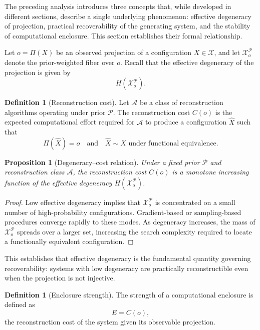 \documentclass[12pt, oneside]{article}
\theoremstyle{plain}
\newtheorem{proposition}[theorem]{Proposition}
\theoremstyle{definition}
\newtheorem{definition}[theorem]{Definition}
\theoremstyle{remark}
\newcommand{\proj}{\Pi}
\newcommand{\config}{\mathcal{X}}
\newcommand{\prior}{\mathcal{P}}
\begin{document}
The preceding analysis introduces three concepts that, while developed in different
sections, describe a single underlying phenomenon: effective degeneracy of projection,
practical recoverability of the generating system, and the stability of computational
enclosure. This section establishes their formal relationship.

Let $o = \proj(X)$ be an observed projection of a configuration $X \in \config$, and
let $\config_o^{\prior}$ denote the prior-weighted fiber over $o$. Recall that the
effective degeneracy of the projection is given by
\[
  H(\config_o^{\prior}).
\]

\begin{definition}[Reconstruction cost]
Let $\mathcal{A}$ be a class of reconstruction algorithms operating under prior
$\prior$. The reconstruction cost $C(o)$ is the expected computational effort required
for $\mathcal{A}$ to produce a configuration $\hat{X}$ such that
\[
  \proj(\hat{X}) = o \quad \text{and} \quad \hat{X} \sim X \text{ under functional equivalence}.
\]
\end{definition}

\begin{proposition}[Degeneracy--cost relation]
Under a fixed prior $\prior$ and reconstruction class $\mathcal{A}$, the reconstruction
cost $C(o)$ is a monotone increasing function of the effective degeneracy
$H(\config_o^{\prior})$.
\end{proposition}

\begin{proof}
Low effective degeneracy implies that $\config_o^{\prior}$ is concentrated on a small
number of high-probability configurations. Gradient-based or sampling-based procedures
converge rapidly to these modes. As degeneracy increases, the mass of $\config_o^{\prior}$
spreads over a larger set, increasing the search complexity required to locate a
functionally equivalent configuration.
\end{proof}

This establishes that effective degeneracy is the fundamental quantity governing
recoverability: systems with low degeneracy are practically reconstructible even when
the projection is not injective.

\begin{definition}[Enclosure strength]
The strength of a computational enclosure is defined as
\[
  E = C(o),
\]
the reconstruction cost of the system given its observable projection.
\end{definition}
\end{document}
